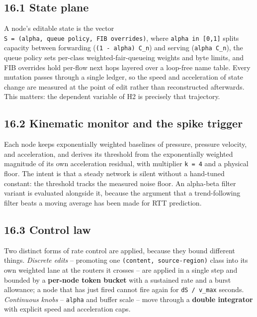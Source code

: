 \documentclass[
  american,
  11pt,
]{article}
\begin{document}
\subsection{16.1 State plane}\label{state-plane}

A node's editable state is the vector
\texttt{S\ =\ (alpha,\ queue\ policy,\ FIB\ overrides)}, where
\texttt{alpha\ in\ {[}0,1{]}} splits capacity between forwarding
(\texttt{(1\ -\ alpha)\ C\_n}) and serving (\texttt{alpha\ C\_n}), the
queue policy sets per-class weighted-fair-queueing weights and byte
limits, and FIB overrides hold per-flow next hops layered over a
loop-free name table. Every mutation passes through a single ledger, so
the speed and acceleration of state change are measured at the point of
edit rather than reconstructed afterwards. This matters: the dependent
variable of H2 is precisely that trajectory.

\subsection{16.2 Kinematic monitor and the spike
trigger}\label{kinematic-monitor-and-the-spike-trigger}

Each node keeps exponentially weighted baselines of pressure, pressure
velocity, and acceleration, and derives its threshold from the
exponentially weighted magnitude of its own acceleration residual, with
multiplier \texttt{k\ =\ 4} and a physical floor. The intent is that a
steady network is silent without a hand-tuned constant: the threshold
tracks the measured noise floor. An alpha-beta filter variant is
evaluated alongside it, because the argument that a trend-following
filter beats a moving average has been made for RTT prediction.

\subsection{16.3 Control law}\label{control-law}

Two distinct forms of rate control are applied, because they bound
different things. \emph{Discrete edits} -- promoting one
\texttt{(content,\ source-region)} class into its own weighted lane at
the routers it crosses -- are applied in a single step and bounded by a
\textbf{per-node token bucket} with a sustained rate and a burst
allowance; a node that has just fired cannot fire again for
\texttt{\textbar{}dS\textbar{}\ /\ v\_max} seconds. \emph{Continuous
knobs} -- \texttt{alpha} and buffer scale -- move through a
\textbf{double integrator} with explicit speed and acceleration caps.
\end{document}
